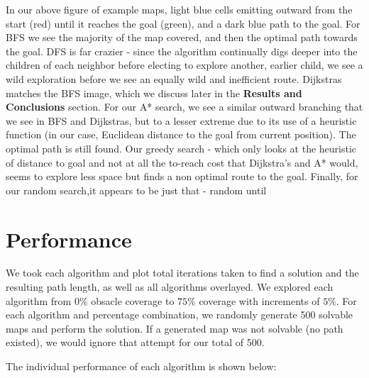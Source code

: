 \documentclass{article}
\begin{document}
In our above figure of example maps, light blue cells emitting outward from the start (red) until it reaches the goal (green), and a dark blue path to the goal. For BFS we see the majority of the map covered, and then the optimal path towards the goal. DFS is far crazier - since the algorithm continually digs deeper into the children of each neighbor before electing to explore another, earlier child, we see a wild exploration before we see an equally wild and inefficient route. Dijkstras matches the BFS image, which we discuss later in the \textbf{Results and Conclusions} section. For our A* search, we see a similar outward branching that we see in BFS and Dijkstras, but to a lesser extreme due to its use of a heuristic function (in our case, Euclidean distance to the goal from current position). The optimal path is still found. Our greedy search - which only looks at the heuristic of distance to goal and not at all the to-reach cost that Dijkstra's and A* would, seems to explore less space but finds a non optimal route to the goal. Finally, for our random search,it appears to be just that - random until 

\section*{Performance}

We took each algorithm and plot total iterations taken to find a solution and the resulting path length, as well as all algorithms overlayed. We explored each algorithm from $0\%$ obsacle coverage to $75\%$ coverage with increments of $5\%$. For each algorithm and percentage combination, we randomly generate 500 solvable maps and perform the solution. If a generated map was not solvable (no path existed), we would ignore that attempt for our total of 500.

The individual performance of each algorithm is shown below:
\end{document}
